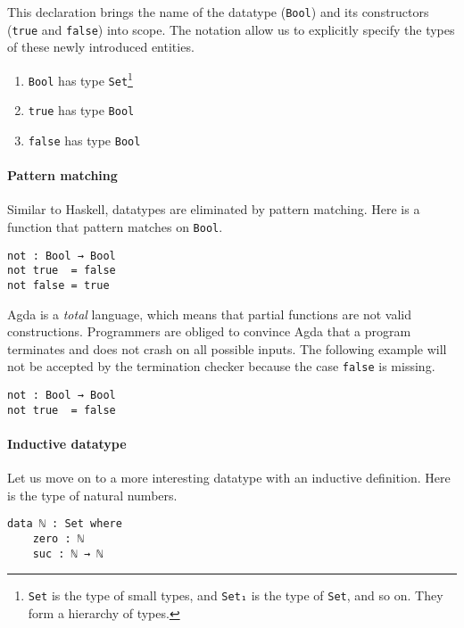 \documentclass[\main/thesis.tex]{subfiles}
\begin{document}
This declaration brings the name of the datatype ({\lstinline|Bool|})
and its constructors ({\lstinline|true|} and {\lstinline|false|}) into scope.
The notation allow us to explicitly specify the types of these newly introduced
entities.

\begin{enumerate}
    \item {\lstinline|Bool|} has type {\lstinline|Set|}\footnote{{\lstinline|Set|} is the type of small types, and {\lstinline|Set₁|} is the type
of {\lstinline|Set|}, and so on. They form a hierarchy of types.}
    \item {\lstinline|true|} has type {\lstinline|Bool|}
    \item {\lstinline|false|} has type {\lstinline|Bool|}
\end{enumerate}

\paragraph{Pattern matching}

Similar to Haskell, datatypes are eliminated by pattern matching.
Here is a function that pattern matches on {\lstinline|Bool|}.

\begin{lstlisting}
not : Bool → Bool
not true  = false
not false = true
\end{lstlisting}

Agda is a \textit{total} language,
which means that partial functions are not valid constructions.
Programmers are obliged to convince Agda that a program terminates and does not
crash on all possible inputs.
The following example will not be accepted by the termination checker because the
case {\lstinline|false|} is missing.

\begin{lstlisting}
not : Bool → Bool
not true  = false
\end{lstlisting}

\paragraph{Inductive datatype} Let us move on to a more interesting datatype with
an inductive definition. Here is the type of natural numbers.

\begin{lstlisting}
data ℕ : Set where
    zero : ℕ
    suc : ℕ → ℕ
\end{lstlisting}
\end{document}
